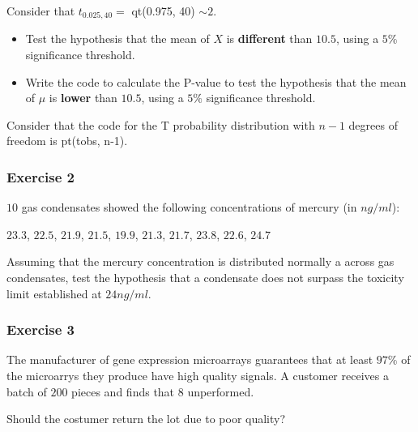 \documentclass[
]{book}
\begin{document}
Consider that \(t_{0.025,40}=\) qt(0.975, 40) \(\sim 2\).

\begin{itemize}
\item
  Test the hypothesis that the mean of \(X\) is \textbf{different} than \(10.5\), using a \(5\%\) significance threshold.
\item
  Write the code to calculate the P-value to test the hypothesis that the mean of \(\mu\) is \textbf{lower} than \(10.5\), using a \(5\%\) significance threshold.
\end{itemize}

Consider that the code for the T probability distribution with \(n-1\) degrees of freedom is pt(tobs, n-1).

\hypertarget{exercise-2-10}{%
\subsubsection{Exercise 2}\label{exercise-2-10}}

\(10\) gas condensates showed the following concentrations of mercury (in \(ng/ml\)):

\(23.3\), \(22.5\), \(21.9\), \(21.5\), \(19.9\), \(21.3\), \(21.7\), \(23.8\), \(22.6\), \(24.7\)

Assuming that the mercury concentration is distributed normally a across gas condensates, test the hypothesis that a condensate does not surpass the toxicity limit established at \(24 ng/ml\).

\hypertarget{exercise-3-7}{%
\subsubsection{Exercise 3}\label{exercise-3-7}}

The manufacturer of gene expression microarrays guarantees that at least \(97\%\) of the microarrys they produce have high quality signals. A customer receives a batch of \(200\) pieces and finds that \(8\) unperformed.

Should the costumer return the lot due to poor quality?

  
\end{document}
